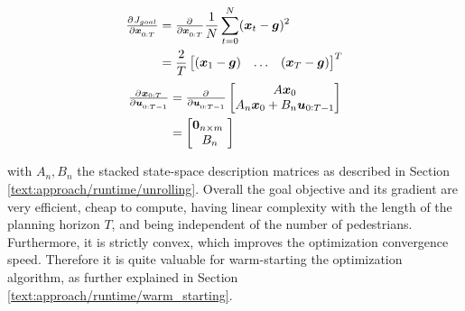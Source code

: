 \begin{align}
\pd{J_{goal}}{\x_{0:T}} &= \pd{}{\x_{0:T}} \frac{1}{N} \sum_{t = 0}^N (\x_t - \boldsymbol{g})^2 \\
&= \frac{2}{T} \begin{bmatrix} (\x_1 - \boldsymbol{g}) & \hdots & (\x_T - \boldsymbol{g}) \end{bmatrix}^T
\end{align}
\begin{align}
\pd{\x_{0:T}}{\u_{0:T-1}} &= \pd{}{\u_{0:T-1}} \begin{bmatrix} A \x_0 \\ A_n \x_0 + B_n \u_{0:T-1} \end{bmatrix} \\
&= \begin{bmatrix} \boldsymbol{0}_{n \times m} \\ B_n \end{bmatrix}
\label{eq:goal_gradient_dynamics}
\end{align}

with $A_n, B_n$ the stacked state-space description matrices as described in Section \ref{text:approach/runtime/unrolling}. 
\newline
Overall the goal objective and its gradient are very efficient, cheap to compute, having linear complexity with the length of the planning horizon $T$, and being independent of the number of pedestrians. Furthermore, it is strictly convex, which improves the optimization convergence speed. Therefore it is quite valuable for warm-starting the optimization algorithm, as further explained in Section \ref{text:approach/runtime/warm_starting}.
